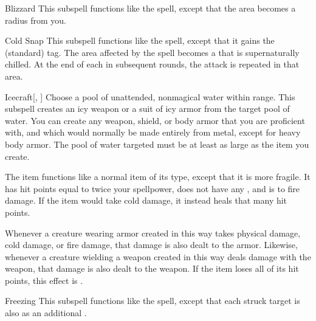 \begin{ability}[\nth{2}]{Blizzard}
This subspell functions like the  spell, except that the area becomes a \areamed radius from you.
\end{ability}
\vspace{0.25em}


\begin{ability}[\nth{2}]{Cold Snap}
This subspell functions like the  spell, except that it gains the  (standard) tag.
The area affected by the spell becomes a  that is supernaturally chilled.
At the end of each  in subsequent rounds, the attack is repeated in that area.
\end{ability}
\vspace{0.25em}


\begin{ability}[\nth{2}]{Icecraft}[, ]
Choose a pool of unattended, nonmagical water within \rngclose range.
This subspell creates an icy weapon or a suit of icy armor from the target pool of water.
You can create any weapon, shield, or body armor that you are proficient with, and which would normally be made entirely from metal, except for heavy body armor.
The pool of water targeted must be at least as large as the item you create.

The item functions like a normal item of its type, except that it is more fragile.
It has hit points equal to twice your spellpower, does not have any , and is  to fire damage.
If the item would take cold damage, it instead heals that many hit points.

Whenever a creature wearing armor created in this way takes physical damage, cold damage, or fire damage, that damage is also dealt to the armor.
Likewise, whenever a creature wielding a weapon created in this way deals damage with the weapon, that damage is also dealt to the weapon.
If the item loses all of its hit points, this effect is .
\end{ability}
\vspace{0.25em}


\begin{ability}[\nth{4}]{Freezing}
This subspell functions like the  spell, except that each struck target is also  as an additional .
\end{ability}
\vspace{0.25em}


